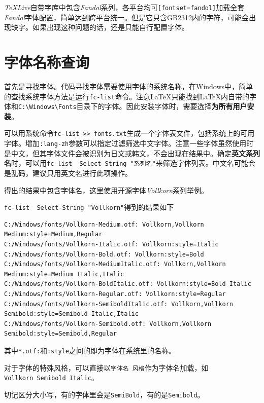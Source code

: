 \documentclass[10pt,openany]{book}
\begin{document}
\textit{TeXLive}自带字库中包含\textit{Fandol}系列，各平台均可\texttt{[fontset=fandol]}加载全套\textit{Fandol}字体配置，简单达到跨平台统一。但是它只含GB2312内的字符，可能会出现缺字。如果出现这种问题的话，还是只能自行配置字体。

\section{字体名称查询}

首先是寻找字体。代码寻找字体需要使用字体的系统名称，在Windows中，简单的查找系统字体方法是运行\texttt{fc-list}命令。注意\LaTeX 只能找到\LaTeX 内自带的字体和\texttt{C:\textbackslash{}Windows\textbackslash{}Fonts}目录下的字体。因此安装字体时，需要选择\textbf{为所有用户安装}。

可以用系统命令\texttt{fc-list\ \textgreater{}\textgreater{}\ fonts.txt}生成一个字体表文件，包括系统上的可用字体。增加\texttt{:lang-zh}参数可以指定过滤筛选中文字体。注意一些字体虽然使用时是中文，但其字体文件会被识别为日文或韩文，不会出现在结果中。确定\textbf{英文系列名}时，可以用\texttt{fc-list\ \textbar{}\ Select-String\ "系列名"}来筛选字体列表。中文名可能会是乱码，建议只用英文名进行此项操作。

得出的结果中包含字体名，这里使用开源字体\textit{Vollkorn}系列举例。

\texttt{fc-list\ \textbar{}\ Select-String\ "Vollkorn"}得到的结果如下

\begin{lstlisting}[title=\textit{Vollkorn}查询结果]
C:/Windows/fonts/Vollkorn-Medium.otf: Vollkorn,Vollkorn Medium:style=Medium,Regular
C:/Windows/fonts/Vollkorn-Italic.otf: Vollkorn:style=Italic
C:/Windows/fonts/Vollkorn-Bold.otf: Vollkorn:style=Bold
C:/Windows/fonts/Vollkorn-MediumItalic.otf: Vollkorn,Vollkorn Medium:style=Medium Italic,Italic
C:/Windows/fonts/Vollkorn-BoldItalic.otf: Vollkorn:style=Bold Italic
C:/Windows/fonts/Vollkorn-Regular.otf: Vollkorn:style=Regular
C:/Windows/fonts/Vollkorn-SemiboldItalic.otf: Vollkorn,Vollkorn Semibold:style=Semibold Italic,Italic
C:/Windows/fonts/Vollkorn-Semibold.otf: Vollkorn,Vollkorn Semibold:style=Semibold,Regular
\end{lstlisting}

其中\texttt{*.otf:}和\texttt{:style}之间的即为字体在系统里的名称。

对于字体的特殊风格，可以直接以\texttt{字体名\ 风格}作为字体名加载，如\texttt{Vollkorn\ Semibold\ Italic}。

切记区分大小写，有的字体里会是\texttt{SemiBold}，有的是\texttt{Semibold}。
\end{document}
